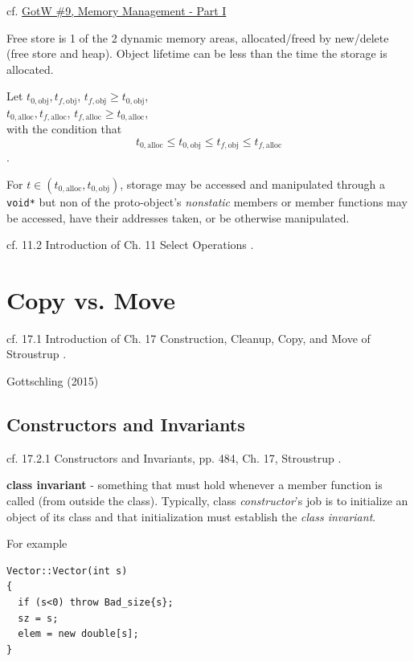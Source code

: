 \documentclass[10pt]{amsart}
\begin{document}
\begin{multicols*}{2}
cf. \href{http://www.gotw.ca/gotw/009.htm}{GotW \#9, Memory Management - Part I}

Free store is 1 of the 2 dynamic memory areas, allocated/freed by new/delete (free store and heap).  Object lifetime can be less than the time the storage is allocated.  

Let $t_{0,\text{obj}}, t_{f,\text{obj}}$, $t_{f,\text{obj}} \geq t_{0,\text{obj}}$, \\
\phantom{Let } $t_{0,\text{alloc}}, t_{f,\text{alloc}}$, $t_{f,\text{alloc}} \geq t_{0,\text{alloc}}$, \\  
with the condition that 
\[
t_{0,\text{alloc}} \leq t_{0,\text{obj}} \leq t_{f,\text{obj}} \leq t_{f,\text{alloc}}
\].  

For $t \in (t_{0,\text{alloc}} , t_{0,\text{obj}} )$, storage may be accessed and manipulated through a \verb|void*| but non of the proto-object's \emph{nonstatic} members or member functions may be accessed, have their addresses taken, or be otherwise manipulated.  




cf. 11.2 Introduction of Ch. 11 Select Operations \cite{Stro2013}.  




\section{Copy vs. Move}  
cf. 17.1 Introduction of Ch. 17 Construction, Cleanup, Copy, and Move of Stroustrup \cite{Stro2013}.  

Gottschling (2015) \cite{Gott2015}

\subsection{Constructors and Invariants}

cf. 17.2.1 Constructors and Invariants, pp. 484, Ch. 17, Stroustrup \cite{Stro2013}.

\textbf{class invariant} - something that must hold whenever a member function is called (from outside the class). Typically, class \emph{constructor}'s job is to initialize an object of its class and that initialization must establish the \emph{class invariant}.

For example
\begin{lstlisting}
Vector::Vector(int s)
{
  if (s<0) throw Bad_size{s};
  sz = s;
  elem = new double[s];
}
\end{lstlisting}


\end{multicols*}
\end{document}

